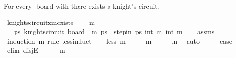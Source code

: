 \begin{isabellebody}
\begin{isamarkuptext}%
For every -board with  there exists a knight's circuit.%
\end{isamarkuptext}\isamarkuptrue%
\isamarkupfalse%
\ knights{\isacharunderscore}{\kern0pt}circuit{\isacharunderscore}{\kern0pt}{}xm{\isacharunderscore}{\kern0pt}exists{\isacharcolon}{\kern0pt}\ \isanewline
\ \ \ {\isachardoublequoteopen}m\ {\isasymge}\ {}{\isachardoublequoteclose}\ \isanewline
\ \ \ {\isachardoublequoteopen}{\isasymexists}ps{\isachardot}{\kern0pt}\ knights{\isacharunderscore}{\kern0pt}circuit\ {\isacharparenleft}{\kern0pt}board\ {}\ m{\isacharparenright}{\kern0pt}\ ps\ {\isasymand}\ step{\isacharunderscore}{\kern0pt}in\ ps\ {\isacharparenleft}{\kern0pt}{}{\isacharcomma}{\kern0pt}int\ m{\isacharminus}{\kern0pt}{}{\isacharparenright}{\kern0pt}\ {\isacharparenleft}{\kern0pt}{}{\isacharcomma}{\kern0pt}int\ m{\isacharparenright}{\kern0pt}{\isachardoublequoteclose}\isanewline
%
\isadelimproof
\ \ %
\endisadelimproof
%
\isatagproof
{}\isamarkupfalse%
\ assms\isanewline
{}\isamarkupfalse%
\ {\isacharparenleft}{\kern0pt}induction\ m\ rule{\isacharcolon}{\kern0pt}\ less{\isacharunderscore}{\kern0pt}induct{\isacharparenright}{\kern0pt}\isanewline
\ \ \isamarkupfalse%
\ {\isacharparenleft}{\kern0pt}less\ m{\isacharparenright}{\kern0pt}\isanewline
\ \ \isamarkupfalse%
\ \isamarkupfalse%
\ {\isachardoublequoteopen}m\ {\isasymin}\ {\isacharbraceleft}{\kern0pt}{}{\isacharcomma}{\kern0pt}{}{\isacharcomma}{\kern0pt}{}{\isacharcomma}{\kern0pt}{}{\isacharcomma}{\kern0pt}{}{\isacharbraceright}{\kern0pt}\ {\isasymor}\ {}\ {\isasymle}\ m{\isacharminus}{\kern0pt}{}{\isachardoublequoteclose}\ \isamarkupfalse%
\ auto\isanewline
\ \ \isamarkupfalse%
\ \isamarkupfalse%
\ {\isacharquery}{\kern0pt}case\isanewline
\ \ \isamarkupfalse%
\ {\isacharparenleft}{\kern0pt}elim\ disjE{\isacharparenright}{\kern0pt}\isanewline
\ \ \ \ \isamarkupfalse%
\ {\isachardoublequoteopen}m\ {\isasymin}\ {\isacharbraceleft}{\kern0pt}{}{\isacharcomma}{\kern0pt}{}{\isacharcomma}{\kern0pt}{}{\isacharcomma}{\kern0pt}{}{\isacharcomma}{\kern0pt}{}{\isacharbraceright}{\kern0pt}{\isachardoublequoteclose}\isanewline

\end{isabellebody}
